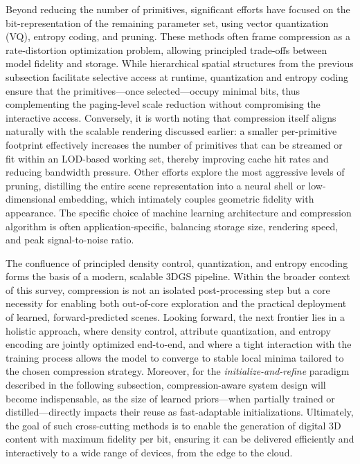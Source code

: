 \documentclass[11pt,a4paper]{article}
\begin{document}
Beyond reducing the number of primitives, significant efforts have focused on the bit-representation of the remaining parameter set, using vector quantization (VQ), entropy coding, and pruning. These methods often frame compression as a rate-distortion optimization problem, allowing principled trade-offs between model fidelity and storage. While hierarchical spatial structures from the previous subsection facilitate selective access at runtime, quantization and entropy coding ensure that the primitives---once selected---occupy minimal bits, thus complementing the paging-level scale reduction without compromising the interactive access. Conversely, it is worth noting that compression itself aligns naturally with the scalable rendering discussed earlier: a smaller per-primitive footprint effectively increases the number of primitives that can be streamed or fit within an LOD-based working set, thereby improving cache hit rates and reducing bandwidth pressure. Other efforts explore the most aggressive levels of pruning, distilling the entire scene representation into a neural shell or low-dimensional embedding, which intimately couples geometric fidelity with appearance. The specific choice of machine learning architecture and compression algorithm is often application-specific, balancing storage size, rendering speed, and peak signal-to-noise ratio.

The confluence of principled density control, quantization, and entropy encoding forms the basis of a modern, scalable 3DGS pipeline. Within the broader context of this survey, compression is not an isolated post-processing step but a core necessity for enabling both out-of-core exploration and the practical deployment of learned, forward-predicted scenes. Looking forward, the next frontier lies in a holistic approach, where density control, attribute quantization, and entropy encoding are jointly optimized end-to-end, and where a tight interaction with the training process allows the model to converge to stable local minima tailored to the chosen compression strategy. Moreover, for the \emph{initialize-and-refine} paradigm described in the following subsection, compression-aware system design will become indispensable, as the size of learned priors---when partially trained or distilled---directly impacts their reuse as fast-adaptable initializations. Ultimately, the goal of such cross-cutting methods is to enable the generation of digital 3D content with maximum fidelity per bit, ensuring it can be delivered efficiently and interactively to a wide range of devices, from the edge to the cloud.
\end{document}
